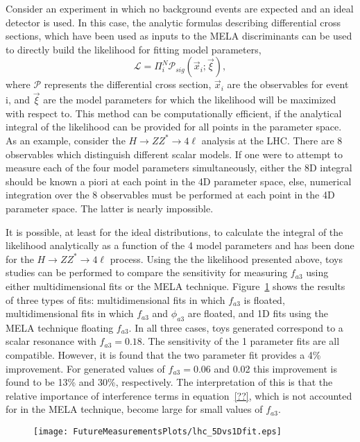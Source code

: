 Consider an experiment in which no background events are expected
and an ideal detector is used.  In this case, the analytic formulas
describing differential cross
sections, which have been used as inputs to the MELA discriminants
can be used to directly build the likelihood for fitting 
model parameters,
\begin{equation}
\mathscr{L}=\Pi^N_i \mathscr{P}_{sig}(\vec{x}_i ; \vec{\xi}),
\end{equation}
where $\mathscr{P}$ represents the differential cross section, 
$\vec{x}_i$ are the observables for event i, and $\vec{\xi}$ 
are the model parameters for which the likelihood will be 
maximized with respect to.
This method can be computationally efficient, if the analytical
integral of the likelihood can be provided for all points in the
parameter space.  As an example, consider the 
$H\to ZZ^*\to4\ell$ analysis at the LHC.  There are 8 observables
which distinguish different scalar models.  If one were to 
attempt to measure each of the four model parameters simultaneously,
either the 8D integral should be known a piori at each
point in the 4D parameter space, else, numerical integration 
over the 8 observables must be performed at each point in the 
4D parameter space.  The latter is nearly impossible.  

It is possible, at least for the ideal
distributions, to calculate the integral of the likelihood
analytically as a function of the
4 model parameters and has been done for the $H\to ZZ^*\to 4\ell$ process.  Using the the likelihood presented above, 
toys studies can be performed to compare the sensitivity for 
measuring $f_{a3}$ using either multidimensional fits or the
MELA technique.  Figure~\ref{fig:fa3MultiDimComp} shows the
results of three 
types of fits: multidimensional fits in which $f_{a3}$ is
floated, multidimensional fits in which $f_{a3}$ and $\phi_{a3}$
are floated, and 1D fits using the MELA technique floating $f_{a3}$.
In all three cases, toys generated correspond to
a scalar resonance with $f_{a3}=0.18$.  The sensitivity of the
1 parameter fits are all compatible.  However, it is found that
the two parameter fit provides a 4\% improvement.  For generated
values of $f_{a3}=0.06$ and 0.02 this improvement is found to be
13\% and 30\%, respectively.  The interpretation of this is that
the relative importance of interference terms in equation~\ref{??},
which is not accounted for in the MELA technique, become large for
small values of $f_{a3}$.

\begin{figure}
\begin{center}
\texttt{[image: FutureMeasurementsPlots/lhc\_5Dvs1Dfit.eps]}
\caption{}
\label{fig:fa3MultiDimComp}
\end{center}
\end{figure}

